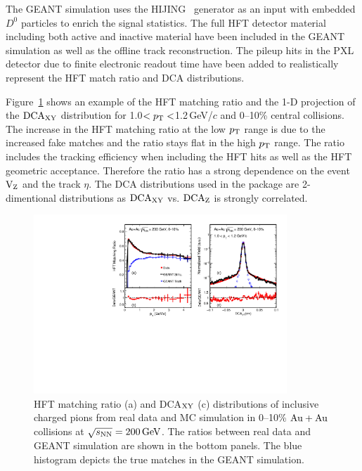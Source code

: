 \documentclass[%
 reprint,	
 amsmath,amssymb,
 aps,
 prc,
]{revtex4-1}
\begin{document}
The GEANT simulation uses the HIJING~\cite{HIJING} generator as an input with embedded $D^0$ particles to enrich the signal statistics. The full HFT detector material including both active and inactive material have been included in the GEANT simulation as well as the offline track reconstruction. The pileup hits in the PXL detector due to finite electronic readout time have been added to realistically represent the HFT match ratio and DCA distributions.

Figure~\ref{fig:HijingRatioDca} shows an example of the HFT matching ratio and the 1-D projection of the $\textup{DCA}_{\textup{XY}}$ distribution for 1.0$<p_{\rm T}<$1.2\,GeV/$c$ and 0--10\% central collisions. The increase in the HFT matching ratio at the low $p_{\rm T}$ range is due to the increased fake matches and the ratio stays flat in the high $p_{\rm T}$ range. The ratio includes the tracking efficiency when including the HFT hits as well as the HFT geometric acceptance. Therefore the ratio has a strong dependence on the event $\textup{V}_\textup{Z}$ and the track $\eta$. The DCA distributions used in the package are 2-dimentional distributions as $\textup{DCA}_{\textup{XY}}$ vs. $\textup{DCA}_\textup{Z}$ is strongly correlated.

\begin{figure}
\centering
\includegraphics[width=0.85\textwidth]{fig/HijingRatioDca.pdf}
\caption{HFT matching ratio (a) and DCA$_{\rm XY}$ (c) distributions of inclusive charged pions from real data and MC simulation in 0--10\% ${\rm{Au + Au}}$ collisions at ${\sqrt{s_{\rm NN}} = \rm{200\,GeV}}$. The ratios between real data and GEANT simulation are shown in the bottom panels. The blue histogram depicts the true matches in the GEANT simulation.}
\label{fig:HijingRatioDca} 
\end{figure}
\end{document}
